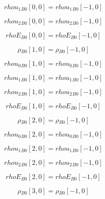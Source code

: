 \documentclass{article}
\begin{document}
\begin{dmath}{rhou_{1}{_{B0}}}[{0,0}] = {rhou_{1}{_{B0}}}[{-1,0}]\end{dmath}

\begin{dmath}{rhou_{2}{_{B0}}}[{0,0}] = {rhou_{2}{_{B0}}}[{-1,0}]\end{dmath}

\begin{dmath}{rhoE{_{B0}}}[{0,0}] = {rhoE{_{B0}}}[{-1,0}]\end{dmath}

\begin{dmath}{\rho{_{B0}}}[{1,0}] = {\rho{_{B0}}}[{-1,0}]\end{dmath}

\begin{dmath}{rhou_{0}{_{B0}}}[{1,0}] = {rhou_{0}{_{B0}}}[{-1,0}]\end{dmath}

\begin{dmath}{rhou_{1}{_{B0}}}[{1,0}] = {rhou_{1}{_{B0}}}[{-1,0}]\end{dmath}

\begin{dmath}{rhou_{2}{_{B0}}}[{1,0}] = {rhou_{2}{_{B0}}}[{-1,0}]\end{dmath}

\begin{dmath}{rhoE{_{B0}}}[{1,0}] = {rhoE{_{B0}}}[{-1,0}]\end{dmath}

\begin{dmath}{\rho{_{B0}}}[{2,0}] = {\rho{_{B0}}}[{-1,0}]\end{dmath}

\begin{dmath}{rhou_{0}{_{B0}}}[{2,0}] = {rhou_{0}{_{B0}}}[{-1,0}]\end{dmath}

\begin{dmath}{rhou_{1}{_{B0}}}[{2,0}] = {rhou_{1}{_{B0}}}[{-1,0}]\end{dmath}

\begin{dmath}{rhou_{2}{_{B0}}}[{2,0}] = {rhou_{2}{_{B0}}}[{-1,0}]\end{dmath}

\begin{dmath}{rhoE{_{B0}}}[{2,0}] = {rhoE{_{B0}}}[{-1,0}]\end{dmath}

\begin{dmath}{\rho{_{B0}}}[{3,0}] = {\rho{_{B0}}}[{-1,0}]\end{dmath}
\end{document}
